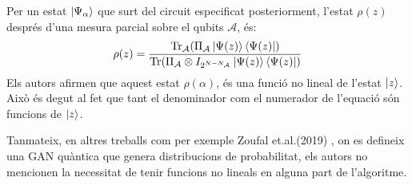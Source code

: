 Per un estat $\ket{\Psi_\alpha}$ que surt del circuit especificat posteriorment, l'estat $\rho(z)$ després d'una mesura parcial sobre el qubits $\mathcal{A}$, és:
$$
\rho(z) = \frac{\Tr_\mathcal{A}(\Pi_\mathcal{A}\ket{\Psi(z)}\bra{\Psi(z)})}{\Tr(\Pi_\mathcal{A} \otimes I_{2^{N-N_\mathcal{A}}}\ket{\Psi(z)}\bra{\Psi(z)})}
$$
 Els autors afirmen que aquest estat $\rho(\alpha)$, és una funció no lineal de l'estat $\ket{z}$. Això és degut al fet que tant el denominador com el numerador de l'equació són funcions de $\ket{z}$.

Tanmateix, en altres treballs com per exemple Zoufal et.al.(2019) \cite{QGAN_IBM}, on es defineix una GAN quàntica que genera distribucions de probabilitat, els autors no mencionen la necessitat de tenir funcions no lineals en alguna part de l'algoritme.


